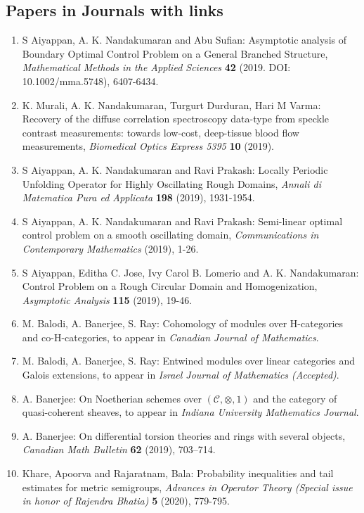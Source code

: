 \subsection{Papers in Journals with links}

\begin{enumerate}
\item S Aiyappan, A. K. Nandakumaran and Abu Sufian: Asymptotic analysis of Boundary Optimal Control Problem on a General Branched Structure, \emph{Mathematical Methods in the Applied Sciences} {\bf 42} (2019. DOI: 10.1002/mma.5748), 6407-6434.
\item K. Murali, A. K. Nandakumaran, Turgurt Durduran, Hari M Varma: Recovery of the diffuse correlation spectroscopy data-type from speckle contrast measurements: towards low-cost, deep-tissue blood flow measurements, \emph{Biomedical Optics Express 5395} {\bf 10} (2019).
\item S Aiyappan, A. K. Nandakumaran and Ravi Prakash: Locally Periodic Unfolding Operator for Highly Oscillating Rough Domains, \emph{Annali di Matematica Pura ed Applicata} {\bf 198} (2019), 1931-1954.
\item S Aiyappan, A. K. Nandakumaran and Ravi Prakash: Semi-linear optimal control problem on a smooth oscillating domain, \emph{Communications in Contemporary Mathematics} {\bf } (2019), 1-26.
\item S Aiyappan, Editha C. Jose, Ivy Carol B. Lomerio and A. K. Nandakumaran: Control Problem on a Rough Circular Domain and Homogenization, \emph{Asymptotic Analysis} {\bf 115} (2019), 19-46.
\item M. Balodi, A. Banerjee, S. Ray: Cohomology of modules over H-categories and co-H-categories, to appear in \emph{Canadian Journal of Mathematics}.
\item M. Balodi, A. Banerjee, S. Ray: Entwined modules over linear categories and Galois extensions, to appear in \emph{Israel Journal of Mathematics (Accepted)}.
\item A. Banerjee: On Noetherian schemes over $(\mathcal C,\otimes,1)$ and the category of quasi-coherent sheaves, to appear in \emph{Indiana University Mathematics Journal}.
\item A. Banerjee: On differential torsion theories and rings with several objects, \emph{Canadian Math Bulletin} {\bf 62} (2019), 703--714.
\item Khare, Apoorva and Rajaratnam, Bala: Probability inequalities and tail estimates for metric semigroups, \emph{Advances in Operator Theory (Special issue in honor of Rajendra Bhatia)} {\bf 5} (2020), 779-795.

\end{enumerate}
